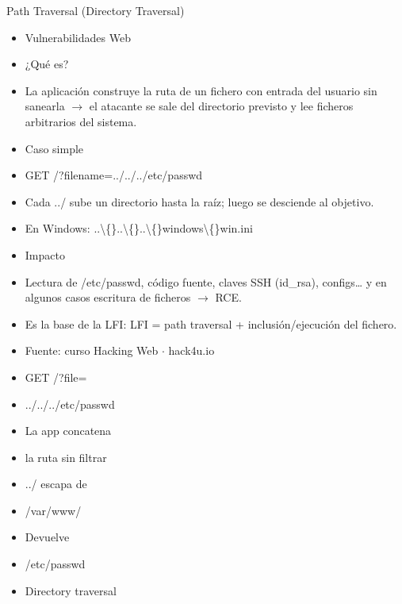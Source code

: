 \documentclass[aspectratio=169,10pt]{beamer}
\begin{document}
\begin{frame}[allowframebreaks]{Path Traversal (Directory Traversal)}
\small
  \begin{itemize}
  \item Vulnerabilidades Web
  \item ¿Qué es?
  \item La aplicación construye la ruta de un fichero con entrada del usuario sin sanearla $\rightarrow$ el atacante se sale del directorio previsto y lee ficheros arbitrarios del sistema.
  \item Caso simple
  \item GET /?filename=../../../etc/passwd
  \item Cada ../ sube un directorio hasta la raíz; luego se desciende al objetivo.
  \item En Windows: ..\textbackslash\{\}..\textbackslash\{\}..\textbackslash\{\}windows\textbackslash\{\}win.ini
  \item Impacto
  \item Lectura de /etc/passwd, código fuente, claves SSH (id\_rsa), configs\dots{} y en algunos casos escritura de ficheros $\rightarrow$ RCE.
  \item Es la base de la LFI: LFI = path traversal + inclusión/ejecución del fichero.
  \item Fuente: curso Hacking Web $\cdot$ hack4u.io
  \item GET /?file=
  \item ../../../etc/passwd
  \item La app concatena
  \item la ruta sin filtrar
  \item ../ escapa de
  \item /var/www/
  \item Devuelve
  \item /etc/passwd
  \item Directory traversal
  \end{itemize}
\end{frame}
\end{document}
